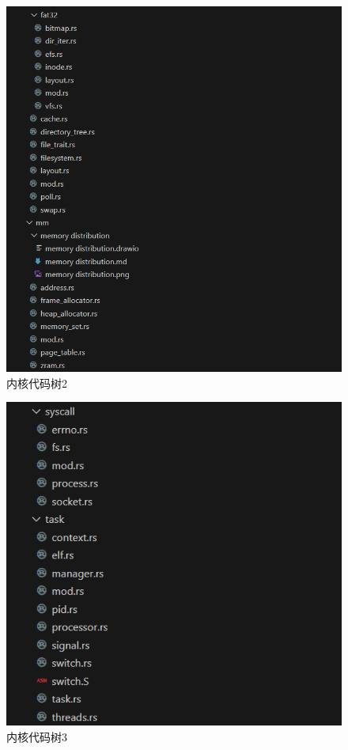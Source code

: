 \begin{figure}[htb]
	\centering
	\includegraphics[width=\textwidth]{figures/02-03-内核代码树2.png}
	\caption{
		内核代码树2
	}
	\label{fig:内核代码树2}
\end{figure}

\begin{figure}[htb]
	\centering
	\includegraphics[width=\textwidth]{figures/02-03-内核代码树3.png}
	\caption{
		内核代码树3
	}
	\label{fig:内核代码树3}
\end{figure}

